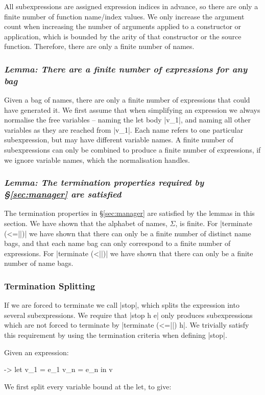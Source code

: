\documentclass[draft]{sigplanconf}
\newcommand{\lemma}[1]{\subsubsection*{\textit{Lemma: #1}}}
\begin{document}
All subexpressions are assigned expression indices in advance, so there are only a finite number of function name/index values. We only increase the argument count when increasing the number of arguments applied to a constructor or application, which is bounded by the arity of that constructor or the source function. Therefore, there are only a finite number of names.

\lemma{There are a finite number of expressions for any bag}

Given a bag of names, there are only a finite number of expressions that could have generated it. We first assume that when simplifying an expression we always normalise the free variables -- naming the let body |v_1|, and naming all other variables as they are reached from |v_1|. Each name refers to one particular subexpression, but may have different variable names. A finite number of subexpressions can only be combined to produce a finite number of expressions, if we ignore variable names, which the normalisation handles.

\lemma{The termination properties required by \S\ref{sec:manager} are satisfied}

The termination properties in \S\ref{sec:manager} are satisfied by the lemmas in this section. We have shown that the alphabet of names, $\Sigma$, is finite. For |terminate (<=||)| we have shown that there can only be a finite number of distinct name bags, and that each name bag can only correspond to a finite number of expressions. For |terminate (<||)| we have shown that there can only be a finite number of name bags.

\subsubsection{Termination Splitting}
\label{sec:term_split}

If we are forced to terminate we call |stop|, which splits the expression into several subexpressions. We require that |stop h e| only produces subexpressions which are not forced to terminate by |terminate (<=||) h|. We trivially satisfy this requirement by using the termination criteria when defining |stop|.

Given an expression:

\begin{code}
\free ->  let  v_1 = e_1
               v_n = e_n
          in   v
\end{code}

We first split every variable bound at the let, to give:
\end{document}
